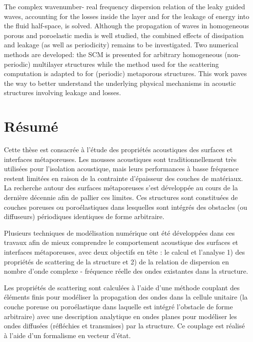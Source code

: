 The complex wavenumber- real frequency dispersion relation of the leaky guided waves, accounting for the losses inside the layer and for the leakage of energy into the fluid half-space, is solved. Although the propagation of waves in homogeneous porous and poroelastic media is well studied, the combined effects of dissipation and leakage (as well as periodicity) remains to be investigated. Two numerical methods are developed: the SCM is presented for arbitrary homogeneous (non-periodic) multilayer structures while the method used for the scattering computation is adapted to for (periodic) metaporous structures. This work paves the way to better understand the underlying physical mechanisms in acoustic structures involving leakage and losses.
\vspace*{\fill}

\chapter*{Résumé}
\vspace*{2cm}
Cette thèse est consacrée à l'étude des propriétés acoustiques des surfaces et interfaces métaporeuses. Les mousses acoustiques sont traditionnellement très utilisées pour l’isolation acoustique, mais leurs performances à basse fréquence restent limitées en raison de la contrainte d’épaisseur des couches de matériaux. La recherche autour des surfaces métaporeuses s’est développée au cours de la dernière décennie afin de pallier ces limites. Ces structures sont constituées de couches poreuses ou poroélastiques dans lesquelles sont intégrés des obstacles (ou diffuseurs) périodiques identiques de forme arbitraire.

Plusieurs techniques de modélisation numérique ont été développées dans ces travaux afin de mieux comprendre le comportement acoustique des surfaces et interfaces métaporeuses, avec deux objectifs en tête : le calcul et l'analyse 1) des propriétés de scattering de la structure et 2) de la relation de dispersion en nombre d’onde complexe - fréquence réelle des ondes existantes dans la structure.

Les propriétés de scattering sont calculées à l'aide d'une méthode couplant des éléments finis pour modéliser la propagation des ondes dans la cellule unitaire (la couche poreuse ou poroélastique dans laquelle est intégré l’obstacle de forme arbitraire) avec une description analytique en ondes planes pour modéliser les ondes diffusées (réfléchies et transmises) par la structure. Ce couplage est réalisé à l’aide d’un formalisme en vecteur d'état.

